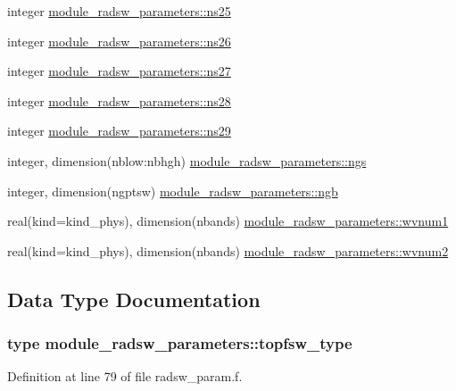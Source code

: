 \begin{DoxyCompactItemize}
\item 
integer \hyperlink{group__module__radsw__main_gabaf12fd8281745e299a942530cef1a97}{module\+\_\+radsw\+\_\+parameters\+::ns25}
\item 
integer \hyperlink{group__module__radsw__main_ga3cf6dd031ffa5545db46bb1b54fe42b6}{module\+\_\+radsw\+\_\+parameters\+::ns26}
\item 
integer \hyperlink{group__module__radsw__main_ga801c6d2223877ddf3f633dc7ffcd528b}{module\+\_\+radsw\+\_\+parameters\+::ns27}
\item 
integer \hyperlink{group__module__radsw__main_gac2b720c6b0ab80759cfe83aa53fb4540}{module\+\_\+radsw\+\_\+parameters\+::ns28}
\item 
integer \hyperlink{group__module__radsw__main_gae966fc99ad683e9e0ee30f792db413fc}{module\+\_\+radsw\+\_\+parameters\+::ns29}
\item 
integer, dimension(nblow\+:nbhgh) \hyperlink{group__module__radsw__main_ga715ab3195493dff0639da443c21e4fb5}{module\+\_\+radsw\+\_\+parameters\+::ngs}
\item 
integer, dimension(ngptsw) \hyperlink{group__module__radsw__main_gafdd8496d7eaa017f7f1e08e998945c1e}{module\+\_\+radsw\+\_\+parameters\+::ngb}
\item 
real(kind=kind\+\_\+phys), dimension(nbands) \hyperlink{group__module__radsw__main_gadc7827bd2bed6502a0a60b40b8f1deeb}{module\+\_\+radsw\+\_\+parameters\+::wvnum1}
\item 
real(kind=kind\+\_\+phys), dimension(nbands) \hyperlink{group__module__radsw__main_ga88594ac7d3fbf13f2fdbac4b3b844d88}{module\+\_\+radsw\+\_\+parameters\+::wvnum2}
\end{DoxyCompactItemize}


\subsection{Data Type Documentation}
\label{structmodule__radsw__parameters_1_1topfsw__type}
\hypertarget{namespacemodule__radsw__parameters_structmodule__radsw__parameters_1_1topfsw__type}{}
\subsubsection{type module\+\_\+radsw\+\_\+parameters\+:\+:topfsw\+\_\+type}


Definition at line 79 of file radsw\+\_\+param.\+f.



